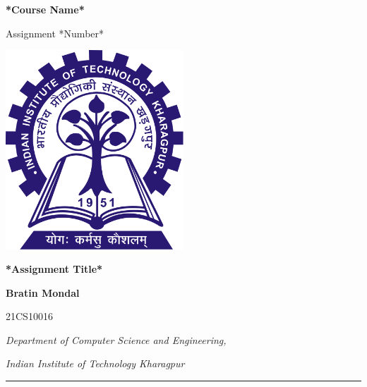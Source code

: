 \documentclass[12pt]{article}
\newcommand{\myName}{Bratin Mondal}
\newcommand{\myRollNumber}{21CS10016}
\newcommand{\myCourse}{*Course Name*}
\newcommand{\myAssignment}{*Number*}
\newcommand{\myAssignmentTitle}{*Assignment Title*}
\newcommand{\myUniversity}{Indian Institute of Technology Kharagpur}
\begin{document}
\begin{titlepage}
    \centering
    
    {\Huge{\textbf{\myCourse}}}
    \vspace{0.2cm}
    
    {\Huge{Assignment \myAssignment}}
    
    \vspace{2cm}
    
    \includegraphics[width=0.5\textwidth]{iit_kgp_logo.png}
    
    \vspace{2cm}
    
    {\Huge\textbf{\myAssignmentTitle}}
    
    \vspace{1cm}
    
    {\Large\textbf{\myName}} 
    \vspace{0.2cm}
    
    \large{\myRollNumber}    
    \vspace{1cm}
    
    {\large\textit{Department of Computer Science and Engineering,}}
    
    {\large\textit{\myUniversity}}
    \vspace{0.3cm}
    
    \hrule 
    \vspace{0.5cm}
    
    
\end{titlepage}
\end{document}
